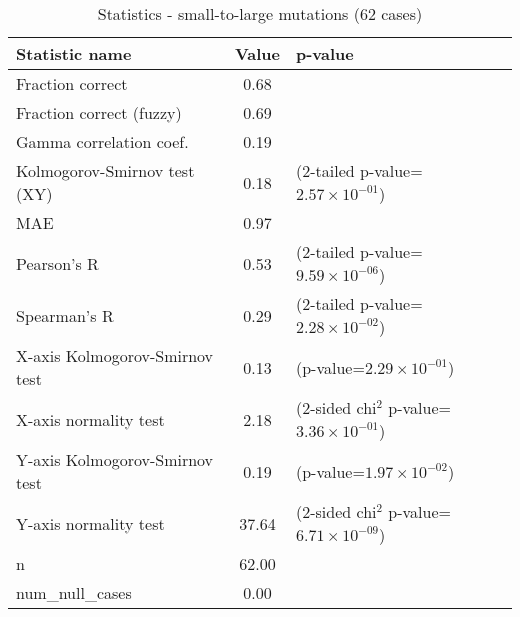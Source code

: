 \documentclass[10pt, letterpaper, oneside, titlepage, landscape]{scrreprt}
\begin{document}
\begin{table}[H]\begin{center}
\begin{tabular}{ l S[table-format=3.2] l}
Statistic name & {Value} & p-value\\
\hline
Fraction correct & 0.68 & \\
Fraction correct (fuzzy) & 0.69 & \\
Gamma correlation coef. & 0.19 & \\
Kolmogorov-Smirnov test (XY) & 0.18 & (2-tailed p-value=$2.57\times10^{-01}$)\\
MAE & 0.97 & \\
Pearson's R & 0.53 & (2-tailed p-value=$9.59\times10^{-06}$)\\
Spearman's R & 0.29 & (2-tailed p-value=$2.28\times10^{-02}$)\\
X-axis Kolmogorov-Smirnov test & 0.13 & (p-value=$2.29\times10^{-01}$)\\
X-axis normality test & 2.18 & (2-sided chi$^{2}$ p-value=$3.36\times10^{-01}$)\\
Y-axis Kolmogorov-Smirnov test & 0.19 & (p-value=$1.97\times10^{-02}$)\\
Y-axis normality test & 37.64 & (2-sided chi$^{2}$ p-value=$6.71\times10^{-09}$)\\
n & 62.00 & \\
num\_null\_cases & 0.00 & \\
\end{tabular}
\caption{Statistics - small-to-large mutations (62 cases)}
\end{center}\end{table}
\end{document}
